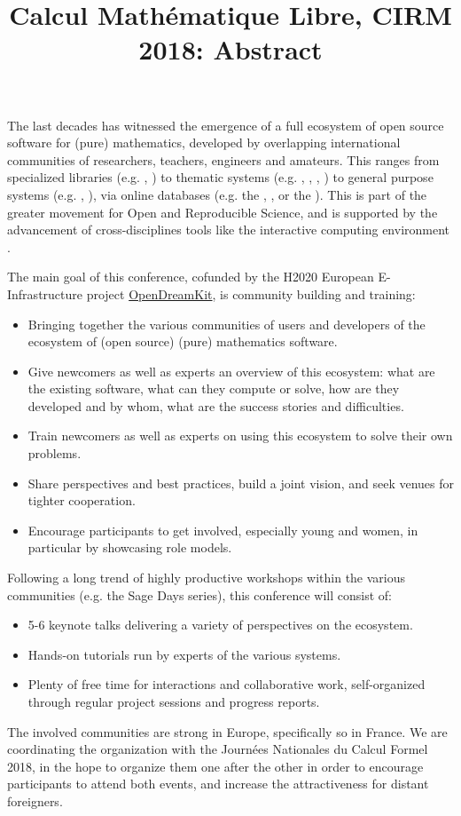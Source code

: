 \documentclass[12pt]{amsbook}
\begin{document}
\title{Calcul Mathématique Libre, CIRM 2018: Abstract}

The last decades has witnessed the emergence of a full ecosystem of
open source software for (pure) mathematics, developed by overlapping
international communities of researchers, teachers, engineers and
amateurs. This ranges from specialized libraries (e.g. \MPIR, \Linbox)
to thematic systems (e.g. \GAP, \Pari, \Singular, \xcas) to general
purpose systems (e.g. \Mathemagix, \Sage), via online databases
(e.g. the \OEIS, \MathHub, or the \LMFDB). This is part of the greater
movement for Open and Reproducible Science, and is supported by the
advancement of cross-disciplines tools like the interactive computing
environment \Jupyter.

The main goal of this conference, cofunded by the H2020 European
E-Infrastructure project \href{opendreamkit.org}{OpenDreamKit}, is
community building and training:
\begin{itemize}
\item Bringing together the various communities of users and
  developers of the ecosystem of (open source) (pure) mathematics
  software.
\item Give newcomers as well as experts an overview of this ecosystem:
  what are the existing software, what can they compute or solve, how
  are they developed and by whom, what are the success stories and
  difficulties.
\item Train newcomers as well as experts on using this ecosystem to
  solve their own problems.
\item Share perspectives and best practices, build a joint vision, and
  seek venues for tighter cooperation.
\item Encourage participants to get involved, especially young and
  women, in particular by showcasing role models.
\end{itemize}

Following a long trend of highly productive workshops within the
various communities (e.g. the Sage Days series), this conference will
consist of:
\begin{itemize}
\item 5-6 keynote talks delivering a variety of perspectives on the
  ecosystem.
\item Hands-on tutorials run by experts of the various systems.
\item Plenty of free time for interactions and collaborative work,
  self-organized through regular project sessions and progress
  reports.
\end{itemize}

The involved communities are strong in Europe, specifically so in
France. We are coordinating the organization with the Journées
Nationales du Calcul Formel 2018, in the hope to organize them one
after the other in order to encourage participants to attend both
events, and increase the attractiveness for distant foreigners.
\end{document}
